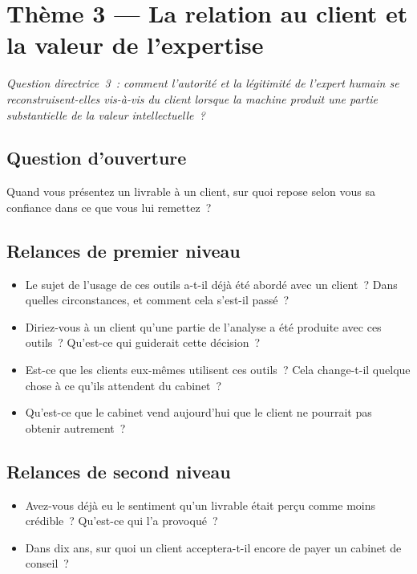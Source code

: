 \section{Thème 3 --- La relation au client et la valeur de l'expertise}

\textit{Question directrice~3~: comment l'autorité et la légitimité de l'expert humain
se reconstruisent-elles vis-à-vis du client lorsque la machine produit une partie
substantielle de la valeur intellectuelle~?}

\subsection*{Question d'ouverture}

Quand vous présentez un livrable à un client, sur quoi repose selon vous sa confiance
dans ce que vous lui remettez~?

\subsection*{Relances de premier niveau}

\begin{itemize}
    \item Le sujet de l'usage de ces outils a-t-il déjà été abordé avec un client~?
    Dans quelles circonstances, et comment cela s'est-il passé~?
    \item Diriez-vous à un client qu'une partie de l'analyse a été produite avec ces
    outils~? Qu'est-ce qui guiderait cette décision~?
    \item Est-ce que les clients eux-mêmes utilisent ces outils~? Cela change-t-il
    quelque chose à ce qu'ils attendent du cabinet~?
    \item Qu'est-ce que le cabinet vend aujourd'hui que le client ne pourrait pas
    obtenir autrement~?
\end{itemize}

\subsection*{Relances de second niveau}

\begin{itemize}
    \item Avez-vous déjà eu le sentiment qu'un livrable était perçu comme moins
    crédible~? Qu'est-ce qui l'a provoqué~?
    \item Dans dix ans, sur quoi un client acceptera-t-il encore de payer un cabinet
    de conseil~?
\end{itemize}

